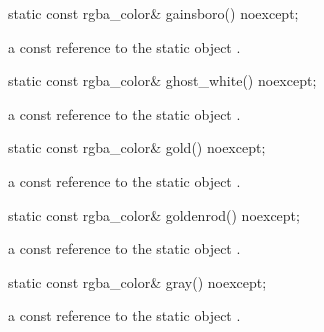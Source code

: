 \begin{itemdecl}
    static const rgba_color& gainsboro() noexcept;
\end{itemdecl}
\begin{itemdescr}
    \pnum
    \returns
    a const reference to the static  object .
\end{itemdescr}

\begin{itemdecl}
    static const rgba_color& ghost_white() noexcept;
\end{itemdecl}
\begin{itemdescr}
    \pnum
    \returns
    a const reference to the static  object .
\end{itemdescr}

\begin{itemdecl}
    static const rgba_color& gold() noexcept;
\end{itemdecl}
\begin{itemdescr}
    \pnum
    \returns
    a const reference to the static  object .
\end{itemdescr}

\begin{itemdecl}
    static const rgba_color& goldenrod() noexcept;
\end{itemdecl}
\begin{itemdescr}
    \pnum
    \returns
    a const reference to the static  object .
\end{itemdescr}

\begin{itemdecl}
    static const rgba_color& gray() noexcept;
\end{itemdecl}
\begin{itemdescr}
    \pnum
    \returns
    a const reference to the static  object .
\end{itemdescr}

